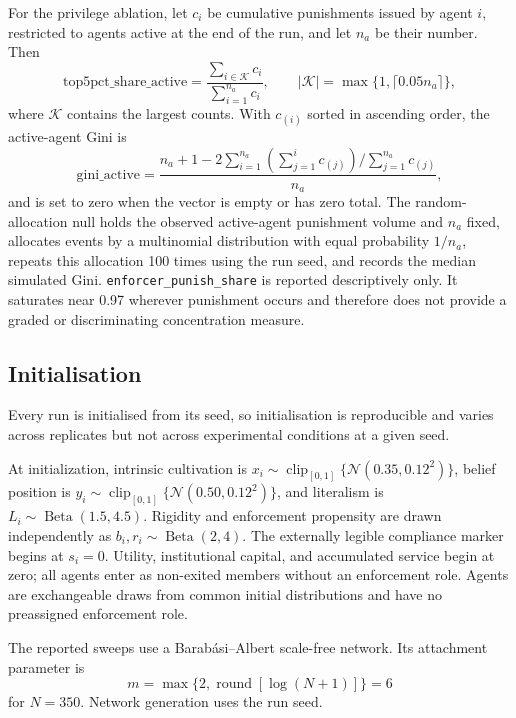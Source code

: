 \documentclass[12pt]{article}
\begin{document}
For the privilege ablation, let \(c_i\) be cumulative punishments issued by agent
\(i\), restricted to agents active at the end of the run, and let \(n_a\) be
their number. Then
\begin{equation}
 \mathrm{top5pct\_share\_active}=\frac{\sum_{i\in\mathcal{K}}c_i}{\sum_{i=1}^{n_a}c_i},\qquad |\mathcal{K}|=\max\{1,\lceil0.05n_a\rceil\},
\end{equation}
where \(\mathcal{K}\) contains the largest counts. With \(c_{(i)}\) sorted in
ascending order, the active-agent Gini is
\begin{equation}
 \mathrm{gini\_active}=\frac{n_a+1-2\sum_{i=1}^{n_a}\left(\sum_{j=1}^{i}c_{(j)}\right)/\sum_{j=1}^{n_a}c_{(j)}}{n_a},
\end{equation}
and is set to zero when the vector is empty or has zero total. The
random-allocation null holds the observed active-agent punishment volume and
\(n_a\) fixed, allocates events by a multinomial distribution with equal
probability \(1/n_a\), repeats this allocation 100 times using the run seed, and
records the median simulated Gini. \texttt{enforcer\_punish\_share} is reported
descriptively only. It saturates near 0.97 wherever punishment occurs and
therefore does not provide a graded or discriminating concentration measure.

\subsection{Initialisation}

Every run is initialised from its seed, so initialisation is reproducible and
varies across replicates but not across experimental conditions at a given seed.

At initialization, intrinsic cultivation is
\(x_i\sim\operatorname{clip}_{[0,1]}\{\mathcal{N}(0.35,0.12^2)\}\), belief
position is \(y_i\sim\operatorname{clip}_{[0,1]}\{\mathcal{N}(0.50,0.12^2)\}\),
and literalism is \(L_i\sim\operatorname{Beta}(1.5,4.5)\). Rigidity and
enforcement propensity are drawn independently as
\(b_i,r_i\sim\operatorname{Beta}(2,4)\). The externally legible compliance marker
begins at \(s_i=0\). Utility, institutional capital, and accumulated service
begin at zero; all agents enter as non-exited members without an enforcement
role. Agents are exchangeable draws from common initial distributions and have
no preassigned enforcement role.

The reported sweeps use a Barab\'asi--Albert scale-free network. Its attachment
parameter is
\begin{equation}
 m=\max\{2,\operatorname{round}[\log(N+1)]\}=6
\end{equation}
for \(N=350\). Network generation uses the run seed.
\end{document}
